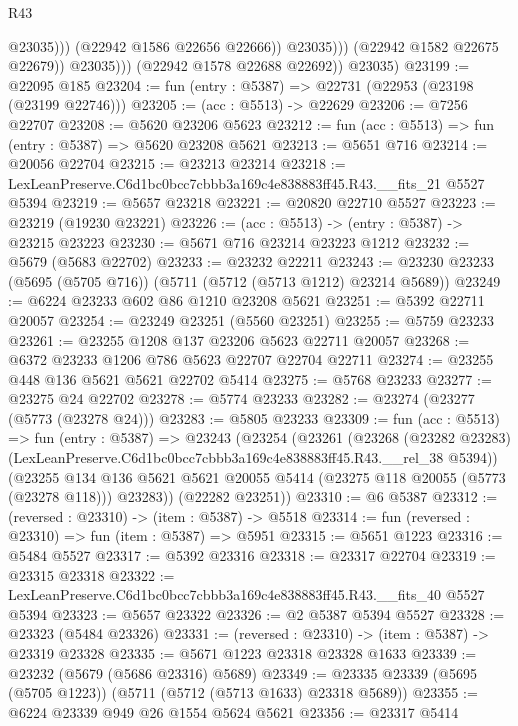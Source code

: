 \begin{lexlean}{R43}
\begin{coremodule}
                              @23035)))
                        (@22942 @1586 @22656 @22666))
                      @23035)))
                (@22942 @1582 @22675 @22679))
              @23035)))
        (@22942 @1578 @22688 @22692))
      @23035)
@23199 := @22095 @185
@23204 := fun (entry : @5387) => @22731 (@22953 (@23198 (@23199 @22746)))
@23205 := (acc : @5513) -> @22629
@23206 := @7256 @22707
@23208 := @5620 @23206 @5623
@23212 := fun (acc : @5513) => fun (entry : @5387) => @5620 @23208 @5621
@23213 := @5651 @716
@23214 := @20056 @22704
@23215 := @23213 @23214
@23218 := LexLeanPreserve.C6d1bc0bcc7cbbb3a169c4e838883ff45.R43.__fits_21 @5527 @5394
@23219 := @5657 @23218
@23221 := @20820 @22710 @5527
@23223 := @23219 (@19230 @23221)
@23226 := (acc : @5513) -> (entry : @5387) -> @23215 @23223
@23230 := @5671 @716 @23214 @23223 @1212
@23232 := @5679 (@5683 @22702)
@23233 := @23232 @22211
@23243 := @23230 @23233 (@5695 (@5705 @716)) (@5711 (@5712 (@5713 @1212) @23214 @5689))
@23249 := @6224 @23233 @602 @86 @1210 @23208 @5621
@23251 := @5392 @22711 @20057
@23254 := @23249 @23251 (@5560 @23251)
@23255 := @5759 @23233
@23261 := @23255 @1208 @137 @23206 @5623 @22711 @20057
@23268 := @6372 @23233 @1206 @786 @5623 @22707 @22704 @22711
@23274 := @23255 @448 @136 @5621 @5621 @22702 @5414
@23275 := @5768 @23233
@23277 := @23275 @24 @22702
@23278 := @5774 @23233
@23282 := @23274 (@23277 (@5773 (@23278 @24)))
@23283 := @5805 @23233
@23309 := fun (acc : @5513) =>
  fun (entry : @5387) =>
  @23243
    (@23254
      (@23261
        (@23268
          (@23282 @23283)
          (LexLeanPreserve.C6d1bc0bcc7cbbb3a169c4e838883ff45.R43.__rel_38 @5394))
        (@23255
          @134
          @136
          @5621
          @5621
          @20055
          @5414
          (@23275 @118 @20055 (@5773 (@23278 @118)))
          @23283))
      (@22282 @23251))
@23310 := @6 @5387
@23312 := (reversed : @23310) -> (item : @5387) -> @5518
@23314 := fun (reversed : @23310) => fun (item : @5387) => @5951
@23315 := @5651 @1223
@23316 := @5484 @5527
@23317 := @5392 @23316
@23318 := @23317 @22704
@23319 := @23315 @23318
@23322 := LexLeanPreserve.C6d1bc0bcc7cbbb3a169c4e838883ff45.R43.__fits_40 @5527 @5394
@23323 := @5657 @23322
@23326 := @2 @5387 @5394 @5527
@23328 := @23323 (@5484 @23326)
@23331 := (reversed : @23310) -> (item : @5387) -> @23319 @23328
@23335 := @5671 @1223 @23318 @23328 @1633
@23339 := @23232 (@5679 (@5686 @23316) @5689)
@23349 := @23335 @23339 (@5695 (@5705 @1223)) (@5711 (@5712 (@5713 @1633) @23318 @5689))
@23355 := @6224 @23339 @949 @26 @1554 @5624 @5621
@23356 := @23317 @5414

\end{coremodule}
\end{lexlean}
